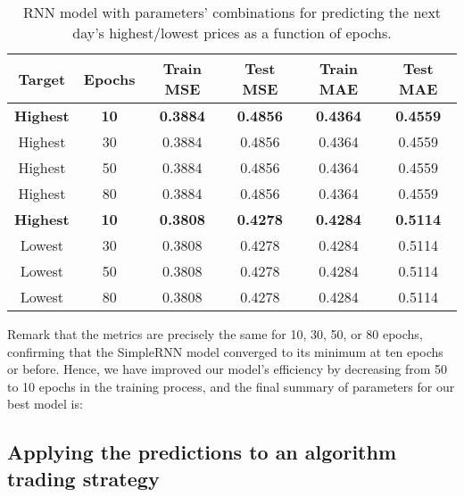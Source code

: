 \begin{table}[H]
\centering
\begin{tabular}{ |c|c|c|c|c|c| }
\hline
\textbf{Target} & \textbf{Epochs} & \textbf{Train MSE} & \textbf{Test MSE} & \textbf{Train MAE} & \textbf{Test MAE}\\
\hline
\rowcolor{lightgray} \textbf{Highest} & \textbf{10} & \textbf{0.3884} &	\textbf{0.4856} &	\textbf{0.4364} &	\textbf{0.4559}\\
Highest & 30 & 0.3884 &	0.4856 &	0.4364 &	0.4559\\
Highest & 50 & 0.3884 &	0.4856 &	0.4364 &	0.4559\\
Highest & 80 & 0.3884 &	0.4856 &	0.4364 &	0.4559\\
\hline
\rowcolor{lightgray} \textbf{Highest} & \textbf{10} & \textbf{0.3808} &	\textbf{0.4278} &	\textbf{0.4284} &	\textbf{0.5114}\\
Lowest & 30 & 0.3808 &	0.4278 &	0.4284 &	0.5114\\
Lowest & 50 & 0.3808 &	0.4278 &	0.4284 &	0.5114\\
Lowest & 80 & 0.3808 &	0.4278 &	0.4284 &	0.5114\\
\hline
\end{tabular}
\label{table:Results for RNN, Tanh, High, Epoch}
\caption{RNN model with parameters' combinations for predicting the next day's highest/lowest prices as a function of epochs.}
\end{table}

Remark that the metrics are precisely the same for 10, 30, 50, or 80 epochs, confirming that the SimpleRNN model converged to its minimum at ten epochs or before. Hence, we have improved our model's efficiency by decreasing from 50 to 10 epochs in the training process, and the final summary of parameters for our best model is:

\begin{table}[H]
\centering
{}
\label{table:Final, Tanh, 1, 800, 50, 1, MSE}
\caption{Final summary of parameters for our best model.}
\end{table}

\subsection{Applying the predictions to an algorithm trading strategy}
\label{chap:Applying the predictions to an algorithm trading strategy}


